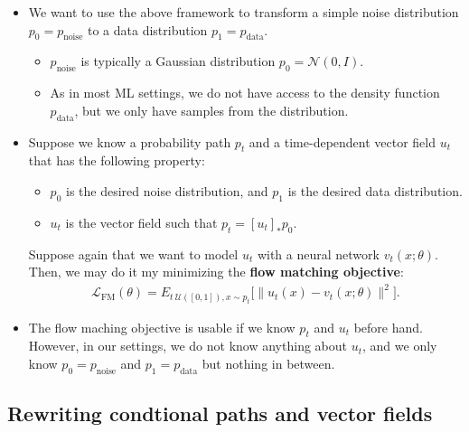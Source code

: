 \documentclass[10pt]{article}
\newcommand{\mrm}[1]{\mathrm{#1}}
\newcommand{\mcal}[1]{\mathcal{#1}}
\begin{document}
\begin{itemize}
  \item We want to use the above framework to transform a simple noise distribution $p_0 = p_{\mrm{noise}}$ to a data distribution $p_1 = p_{\mrm{data}}$.
  \begin{itemize}
    \item $p_{\mrm{noise}}$ is typically a Gaussian distribution $p_0 = \mcal{N}(0,I)$.
    \item As in most ML settings, we do not have access to the density function $p_{\mrm{data}}$, but we only have samples from the distribution.
  \end{itemize}

  \item Suppose we know a probability path $p_t$ and a time-dependent vector field $u_t$ that has the following property:
  \begin{itemize}
    \item $p_0$ is the desired noise distribution, and $p_1$ is the desired data distribution.
    \item $u_t$ is the vector field such that $p_t = [u_t]_* p_0$.
  \end{itemize}
  Suppose again that we want to model $u_t$ with a neural network $v_t(x; \theta)$. Then, we may do it my minimizing the {\bf flow matching objective}:
  \begin{align*}
    \mcal{L}_{\mrm{FM}}(\theta) = E_{t ~ \mcal{U}([0,1]), x \sim p_t} \big[ \| u_t(x) - v_t(x; \theta) \|^2 \big].
  \end{align*}

  \item The flow maching objective is usable if we know $p_t$ and $u_t$ before hand. However, in our settings, we do not know anything about $u_t$, and we only know $p_0 = p_{\mrm{noise}}$ and $p_1 = p_{\mrm{data}}$ but nothing in between.
\end{itemize}

\subsection{Rewriting condtional paths and vector fields}
\end{document}

